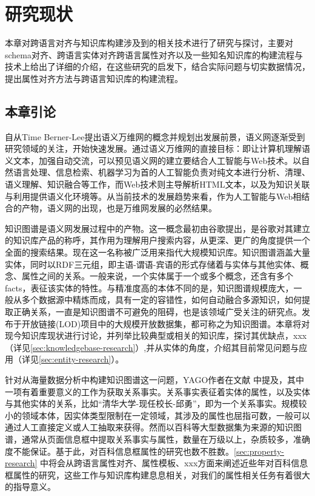 \chapter{研究现状}
\label{cha:china}
本章对跨语言对齐与知识库构建涉及到的相关技术进行了研究与探讨，主要对schema对齐、跨语言实体对齐跨语言属性对齐以及一些知名知识库的构建流程与技术上给出了详细的介绍，在这些研究的启发下，结合实际问题与切实数据情况，提出属性对齐方法与跨语言知识库的构建流程。

\section{本章引论}
自从Time Berner-Lee提出语义万维网的概念并规划出发展前景，语义网逐渐受到研究领域的关注，开始快速发展。通过语义万维网的直接目标：即让计算机理解语义文本，加强自动交流，可以预见语义网的建立要结合人工智能与Web技术。以自然语言处理、信息检索、机器学习为首的人工智能负责对纯文本进行分析、清理、语义理解、知识融合等工作，而Web技术则主导解析HTML文本，以及为知识关联与利用提供语义化环境等。从当前技术的发展趋势来看，作为人工智能与Web相结合的产物，语义网的出现，也是万维网发展的必然结果。

知识图谱是语义网发展过程中的产物。这一概念最初由谷歌提出，是谷歌对其建立的知识库产品的称呼，其作用为理解用户搜索内容，从更深、更广的角度提供一个全面的搜索结果。现在这一名称被广泛用来指代大规模知识库。知识图谱涵盖大量实体，同时以RDF三元组，即主语-谓语-宾语的形式存储着与实体与其他实体、概念、属性之间的关系。一般来说，一个实体属于一个或多个概念，还含有多个facts，表征该实体的特性。与精准度高的本体不同的是，知识图谱规模庞大，一般从多个数据源中精炼而成，具有一定的容错性，如何自动融合多源知识，如何提取正确关系，一直是知识图谱不可避免的阻碍，也是该领域广受关注的研究点。发布于开放链接(LOD)项目中的大规模开放数据集，都可称之为知识图谱。本章将对现今知识库现状进行讨论，并列举比较典型或相关的知识库，探讨其优缺点，xxx（详见\ref{sec:knowledgebase-research}）,并从实体的角度，介绍其目前常见问题与应用（详见\ref{sec:entity-research}）。

针对从海量数据分析中构建知识图谱这一问题，YAGO作者在文献\cite{suchanek2014knowledge} 中提及，其中一项有着重要意义的工作为获取关系事实。关系事实表征着实体的属性，以及实体与其他实体的关系，比如“清华大学-现任校长-邱勇”，即为一个关系事实。规模较小的领域本体，因实体类型限制在一定领域，其涉及的属性也屈指可数，一般可以通过人工直接定义\cite{boyce2007developing}或人工抽取\cite{王巍巍2016双语影视知识图谱的构建研究}来获得。然而以百科等大型数据集为来源的知识图谱，通常从页面信息框中提取关系事实与属性，数量在万级以上，杂质较多，准确度不能保证。基于此，对百科信息框属性的研究也数不胜数。\ref{sec:property-research} 中将会从跨语言属性对齐、属性模板、xxx方面来阐述近些年对百科信息框属性的研究，这些工作与知识库构建息息相关，对我们的属性相关任务有着很大的指导意义。

